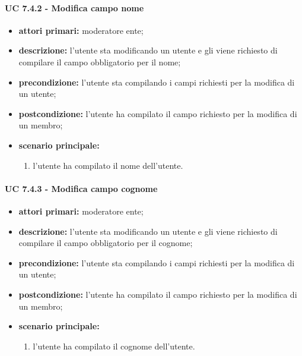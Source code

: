 			\paragraph{UC 7.4.2 - Modifica campo nome}
			\begin{itemize}
				\item \textbf{attori primari:} moderatore ente;
				\item \textbf{descrizione:} l'utente sta modificando un utente e gli viene richiesto di compilare il campo obbligatorio per il nome;
				\item \textbf{precondizione:} l'utente sta compilando i campi richiesti per la modifica di un utente;
				\item \textbf{postcondizione:} l'utente ha compilato il campo richiesto per la modifica di un membro;
				\item \textbf{scenario principale:}
				\begin{enumerate}
					\item{l'utente ha compilato il nome dell'utente.}
				\end{enumerate}
			\end{itemize}

			\paragraph{UC 7.4.3 - Modifica campo cognome}
			\begin{itemize}
				\item \textbf{attori primari:} moderatore ente;
				\item \textbf{descrizione:} l'utente sta modificando un utente e gli viene richiesto di compilare il campo obbligatorio per il cognome;
				\item \textbf{precondizione:} l'utente sta compilando i campi richiesti per la modifica di un utente;
				\item \textbf{postcondizione:} l'utente ha compilato il campo richiesto per la modifica di un membro;
				\item \textbf{scenario principale:}
				\begin{enumerate}
					\item{l'utente ha compilato il cognome dell'utente.}
				\end{enumerate}
			\end{itemize}


